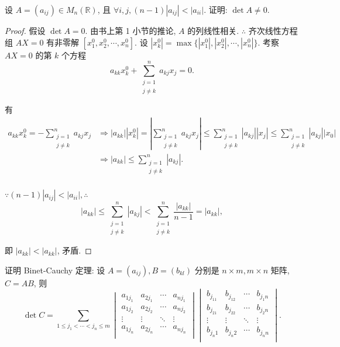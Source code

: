 \documentclass{ctexart}
\begin{document}
\begin{exercise}%
    设 $A=(a_{ij})\in M_n(\mathbb{R})$, 且 $\forall i,j,(n-1)|a_{ij}|<|a_{ii}|$. 证明: $\det A\neq0$.
\end{exercise}
\begin{proof}
    假设 $\det A=0$. 由书上第 1 小节的推论, $A$ 的列线性相关. $\therefore$ 齐次线性方程组 $AX=0$ 有非零解 $[x^0_1,x^0_2,\cdots,x^0_n]$. 设 $|x^0_k|=\max\{|x^0_1|,|x^0_2|,\cdots,|x^0_n|\}$. 考察 $AX=0$ 的第 $k$ 个方程
    \[a_{kk}x^0_k+\sum_{\substack{j=1\\j\neq k}}^na_{kj}x_j=0.\]

    有
    \begin{align*}
        a_{kk}x^0_k=-\sum_{\substack{j=1\\j\neq k}}^na_{kj}x_j & \Rightarrow|a_{kk}||x^0_k|=\left|\sum_{\substack{j=1\\j\neq k}}^na_{kj}x_j\right|\leq\sum_{\substack{j=1\\j\neq k}}^n|a_{kj}||x_j|\leq\sum_{\substack{j=1\\j\neq k}}^n|a_{kj}||x_0| \\
        & \Rightarrow|a_{kk}|\leq\sum_{\substack{j=1\\j\neq k}}^n|a_{kj}|. \\
    \end{align*}

    $\because(n-1)|a_{ij}|<|a_{ii}|,\therefore$
    \[|a_{kk}|\leq\sum_{\substack{j=1\\j\neq k}}^n|a_{kj}|<\sum_{\substack{j=1\\j\neq k}}^n\dfrac{|a_{kk}|}{n-1}=|a_{kk}|,\]

    即 $|a_{kk}|<|a_{kk}|$, 矛盾.
\end{proof}
\begin{exercise}\label{ex3.6}
    证明 Binet-Cauchy 定理: 设 $A=(a_{ij}),B=(b_{kl})$ 分别是 $n\times m,m\times n$ 矩阵, $C=AB$, 则
    \begin{equation}\label{eq5.1}
        \det C=\sum\limits_{1\leq j_1<\cdots<j_n\leq m}\begin{vmatrix}
            a_{1j_1} & a_{2j_1} & \cdots & a_{nj_1} \\
            a_{1j_2} & a_{2j_2} & \cdots & a_{nj_2} \\
            \vdots & \vdots & \ddots & \vdots \\
            a_{1j_n} & a_{2j_n} & \cdots & a_{nj_n} \\
        \end{vmatrix}\begin{vmatrix}
            b_{j_11} & b_{j_12} & \cdots & b_{j_1n} \\
            b_{j_21} & b_{j_22} & \cdots & b_{j_2n} \\
            \vdots & \vdots & \ddots & \vdots \\
            b_{j_n1} & b_{j_n2} & \cdots & b_{j_nn} \\
        \end{vmatrix}.
    \end{equation}
\end{exercise}
\end{document}
